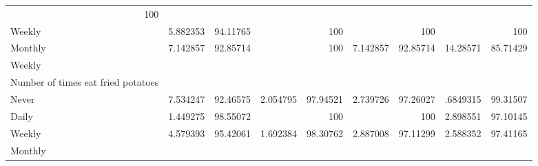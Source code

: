 \documentclass{article}
\begin{document}
\begin{tabular}{lllllllll}
  \multicolumn{1}{r}{100} \\
\multicolumn{1}{l}{\hspace{5em}Weekly} &
  \multicolumn{1}{|r}{5.882353} &
  \multicolumn{1}{r}{94.11765} &
  \multicolumn{1}{r}{} &
  \multicolumn{1}{r}{100} &
  \multicolumn{1}{r}{} &
  \multicolumn{1}{r}{100} &
  \multicolumn{1}{r}{} &
  \multicolumn{1}{r}{100} \\
\multicolumn{1}{l}{\hspace{5em}Monthly} &
  \multicolumn{1}{|r}{7.142857} &
  \multicolumn{1}{r}{92.85714} &
  \multicolumn{1}{r}{} &
  \multicolumn{1}{r}{100} &
  \multicolumn{1}{r}{7.142857} &
  \multicolumn{1}{r}{92.85714} &
  \multicolumn{1}{r}{14.28571} &
  \multicolumn{1}{r}{85.71429} \\
\multicolumn{1}{l}{\hspace{3em}Weekly} &
  \multicolumn{1}{|r}{} &
  \multicolumn{1}{r}{} &
  \multicolumn{1}{r}{} &
  \multicolumn{1}{r}{} &
  \multicolumn{1}{r}{} &
  \multicolumn{1}{r}{} &
  \multicolumn{1}{r}{} &
  \multicolumn{1}{r}{} \\
\multicolumn{1}{l}{\hspace{4em}Number of times eat fried potatoes} &
  \multicolumn{1}{|r}{} &
  \multicolumn{1}{r}{} &
  \multicolumn{1}{r}{} &
  \multicolumn{1}{r}{} &
  \multicolumn{1}{r}{} &
  \multicolumn{1}{r}{} &
  \multicolumn{1}{r}{} &
  \multicolumn{1}{r}{} \\
\multicolumn{1}{l}{\hspace{5em}Never} &
  \multicolumn{1}{|r}{7.534247} &
  \multicolumn{1}{r}{92.46575} &
  \multicolumn{1}{r}{2.054795} &
  \multicolumn{1}{r}{97.94521} &
  \multicolumn{1}{r}{2.739726} &
  \multicolumn{1}{r}{97.26027} &
  \multicolumn{1}{r}{.6849315} &
  \multicolumn{1}{r}{99.31507} \\
\multicolumn{1}{l}{\hspace{5em}Daily} &
  \multicolumn{1}{|r}{1.449275} &
  \multicolumn{1}{r}{98.55072} &
  \multicolumn{1}{r}{} &
  \multicolumn{1}{r}{100} &
  \multicolumn{1}{r}{} &
  \multicolumn{1}{r}{100} &
  \multicolumn{1}{r}{2.898551} &
  \multicolumn{1}{r}{97.10145} \\
\multicolumn{1}{l}{\hspace{5em}Weekly} &
  \multicolumn{1}{|r}{4.579393} &
  \multicolumn{1}{r}{95.42061} &
  \multicolumn{1}{r}{1.692384} &
  \multicolumn{1}{r}{98.30762} &
  \multicolumn{1}{r}{2.887008} &
  \multicolumn{1}{r}{97.11299} &
  \multicolumn{1}{r}{2.588352} &
  \multicolumn{1}{r}{97.41165} \\
\multicolumn{1}{l}{\hspace{5em}Monthly} &

\end{tabular}
\end{document}
